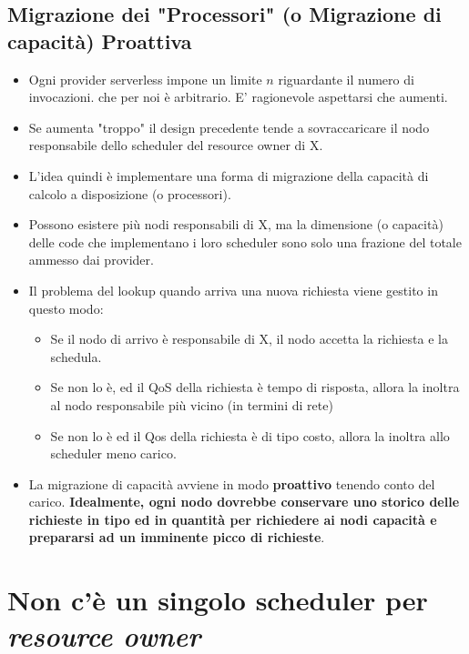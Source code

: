 \documentclass[10pt,a4paper]{article}
\begin{document}
\subsection{Migrazione dei "Processori" (o Migrazione di capacità) Proattiva}

\begin{itemize}
\item Ogni provider serverless impone un limite $n$ riguardante il numero di invocazioni.
che per noi è arbitrario. E' ragionevole aspettarsi che aumenti.

\item Se aumenta "troppo" il design precedente tende a sovraccaricare il nodo responsabile dello scheduler del resource owner di X.

\item L'idea quindi è implementare una forma di migrazione della capacità di calcolo a disposizione (o processori).

\item Possono esistere più nodi responsabili di X, ma la dimensione (o capacità) delle code che implementano i loro scheduler sono solo una frazione del totale ammesso dai provider.

\item Il problema del lookup quando arriva una nuova richiesta viene gestito in questo modo:
\begin{itemize}
\item Se il nodo di arrivo è responsabile di X, il nodo accetta la richiesta e la schedula.
\item Se non lo è, ed il QoS della richiesta è tempo di risposta, allora la inoltra al nodo responsabile più vicino (in termini di rete)

\item Se non lo è ed il Qos della richiesta è di tipo costo, allora la inoltra allo scheduler meno carico.
\end{itemize}

\item La migrazione di capacità avviene in modo \textbf{proattivo} tenendo conto del carico. \textbf{Idealmente, ogni nodo dovrebbe conservare uno storico delle richieste in tipo ed in quantità per richiedere ai nodi capacità e prepararsi ad un imminente picco di richieste}.
\end{itemize}



\section{Non c'è un singolo scheduler per \textit{resource owner}}
\end{document}
